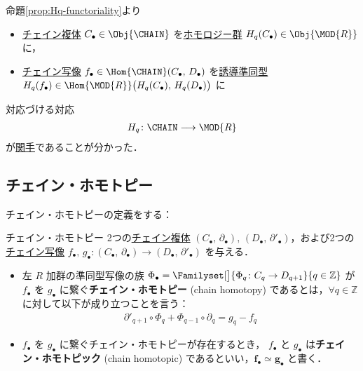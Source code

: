 \documentclass[algtopo_main]{subfiles}
\begin{document}
命題\ref{prop:Hq-functoriality}より
\begin{itemize}
    \item \hyperref[def:CC]{チェイン複体} $C_\bullet \in \Obj{\CHAIN}$ を\hyperref[def:homology-group]{ホモロジー群} $H_q(C_\bullet) \in \Obj{\MOD{R}}$ に，
    \item \hyperref[def:chainmap]{チェイン写像} $f_\bullet \in \Hom{\CHAIN} (C_\bullet,\, D_\bullet)$ を\hyperref[def:induced-chain]{誘導準同型} $H_q(f_\bullet) \in \Hom{\MOD{R}} \bigl( H_q(C_\bullet),\, H_q(D_\bullet) \bigr)$ に
\end{itemize}
対応づける対応
\begin{align}
    H_q \colon \CHAIN \lto \MOD{R}
\end{align}
が\hyperref[def:functor]{関手}であることが分かった．


\subsection{チェイン・ホモトピー}

チェイン・ホモトピーの定義をする：
\begin{mydef}[label=def:chainHomotopy]{チェイン・ホモトピー}
    2つの\hyperref[def:CC]{チェイン複体} $(C_\bullet,\, \partial_\bullet),\, (D_\bullet,\, \partial'_\bullet)$，および2つの\hyperref[def:chainmap]{チェイン写像} $f_\bullet,\, g_\bullet \colon (C_\bullet,\, \partial_\bullet) \longrightarrow (D_\bullet,\, \partial'_\bullet)$ を与える．

    \begin{itemize}
        \item 左 $R$ 加群の準同型写像の族 $\Phi_\bullet = \Familyset[\big]{\Phi_q\colon C_q \to D_{q+1}}{q \in \mathbb{Z}}$ が $f_\bullet$ を $g_\bullet$ に繋ぐ\textbf{チェイン・ホモトピー} (chain homotopy) であるとは，$\forall q \in \mathbb{Z}$ に対して以下が成り立つことを言う：
        \begin{align}
            \partial'_{q+1} \circ \Phi_q + \Phi_{q-1} \circ \partial_q = g_q - f_q
        \end{align}
        \item $f_\bullet$ を $g_\bullet$ に繋ぐチェイン・ホモトピーが存在するとき， $f_\bullet$ と $g_\bullet$ は\textbf{チェイン・ホモトピック} (chain homotopic) であるといい，$\bm{f_\bullet\simeq g_\bullet}$ と書く．
    \end{itemize}
\end{mydef}
\end{document}
